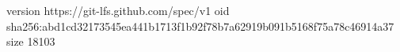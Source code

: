 version https://git-lfs.github.com/spec/v1
oid sha256:abd1cd32173545ea441b1713f1b92f78b7a62919b091b5168f75a78c46914a37
size 18103
